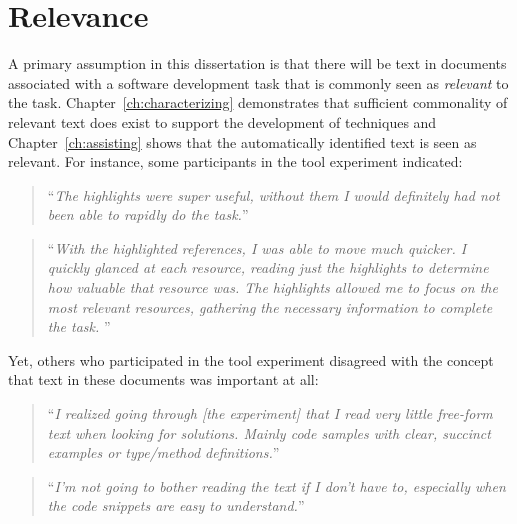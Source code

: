 



\section{Relevance}
\label{cp7:relevance}

A primary assumption in this dissertation
is that there will be text in documents
associated with a software development
task that is commonly seen as \textit{relevant}
to the task. Chapter~\ref{ch:characterizing} demonstrates
that sufficient commonality of relevant
text does exist to support the development
of techniques and Chapter~\ref{ch:assisting} shows
that the automatically identified text
is seen as relevant. For instance,
some participants in the \acs{tool}
experiment indicated:

\smallskip
\begin{quote}
    ``\textit{The highlights were super useful, without them I would definitely had not been able to rapidly do the task.}''
\end{quote}


\begin{quote}
``\textit{With the highlighted references, I was able to move much quicker. I quickly glanced at each resource, reading just the highlights to determine how valuable that resource was. The highlights allowed me to focus on the most relevant resources, gathering the necessary information to complete the task. 
}''
\end{quote}

Yet, others who participated in the \acs{tool}
experiment disagreed with the concept that text
in these documents was important at all:





\smallskip
\begin{quote}
``\textit{I realized going through [the experiment] that I read very little free-form text when looking for solutions. Mainly code samples with clear, succinct examples or type/method definitions.}''
\end{quote}

\begin{quote}
``\textit{I'm not going to bother reading the text if I don't have to, especially when the code snippets are easy to understand.}''
\end{quote}




